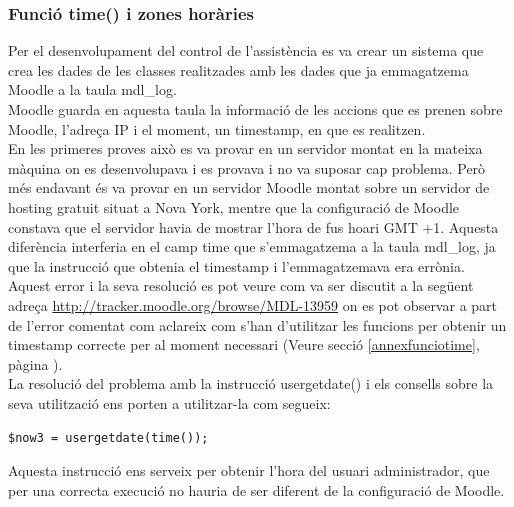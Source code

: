 \documentclass[a4paper]{report}  %
\begin{document}
\subsubsection{Funció time() i zones horàries}\label{DesenvolupamentFuncioTime}
Per el desenvolupament del control de l'assistència es va crear un sistema que crea les dades de les classes realitzades amb les dades que ja emmagatzema Moodle a la taula mdl\_log.\\
Moodle guarda en aquesta taula la informació de les accions que es prenen sobre Moodle, l'adreça IP i el moment, un timestamp, en que es realitzen.\\
En les primeres proves això es va provar en un servidor montat en la mateixa màquina on es desenvolupava i es provava i no va suposar cap problema. 
Però més endavant és va provar en un servidor Moodle montat sobre un servidor de hosting gratuit situat a Nova York, mentre que la configuració de Moodle constava que el servidor havia de mostrar l'hora de fus hoari GMT +1. Aquesta diferència interferia en el camp time que s'emmagatzema a la taula mdl\_log, ja que la instrucció que obtenia el timestamp i l'emmagatzemava era errònia. \\
Aquest error i la seva resolució es pot veure com va ser discutit a la següent adreça \url{http://tracker.moodle.org/browse/MDL-13959} on es pot observar a part de l'error comentat com aclareix com s'han d'utilitzar les funcions per obtenir un timestamp correcte per al moment necessari (Veure secció \ref{annexfunciotime}, pàgina \pageref{annexfunciotime} ).\\

La resolució del problema amb la instrucció usergetdate() i els consells sobre la seva utilització ens porten a utilitzar-la com segueix:\\
\begin{lstlisting}[style=PHP]
	$now3 = usergetdate(time());
\end{lstlisting}
Aquesta instrucció ens serveix per obtenir l'hora del usuari administrador, que per una correcta execució no hauria de ser diferent de la configuració de Moodle.\\
\end{document}
